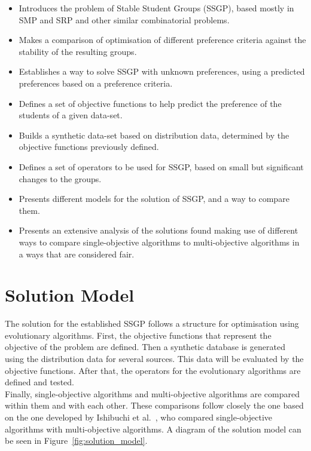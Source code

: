 \begin{itemize}
    \item Introduces the problem of Stable Student Groups (SSGP), based mostly in SMP and SRP and other similar combinatorial problems.
    \item Makes a comparison of optimisation of different preference criteria against the stability of the resulting groups.
    \item Establishes a way to solve SSGP with unknown preferences, using a predicted preferences based on a preference criteria.
    \item Defines a set of objective functions to help predict the preference of the students of a given data-set.
    \item Builds a synthetic data-set based on distribution data, determined by the objective functions previously defined.
    \item Defines a set of operators to be used for SSGP, based on small but significant changes to the groups. 
    \item Presents different models for the solution of SSGP, and a way to compare them.
    \item Presents an extensive analysis of the solutions found making use of different ways to compare single-objective algorithms to multi-objective algorithms in a ways that are considered fair.
\end{itemize}

\section{Solution Model}

The solution for the established SSGP follows a structure for optimisation using evolutionary algorithms. First, the objective functions that represent the objective of the problem are defined. Then a synthetic database is generated using the distribution data for several sources. This data will be evaluated by the objective functions. After that, the operators for the evolutionary algorithms are defined and tested. \\

Finally, single-objective algorithms and multi-objective algorithms are compared within them and with each other. These comparisons follow closely the one based on the one developed by Ishibuchi et al.~\cite{Ishibuchi_single_vs_multiobjective}, who compared single-objective algorithms with multi-objective algorithms. A diagram of the solution model can be seen in Figure~\ref{fig:solution_model}.


